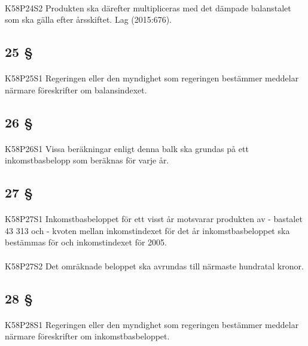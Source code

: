 \documentclass[a4paper,notitlepage,openany,10pt]{book}
\begin{document}
\paragraph*{}
{\tiny K58P24S2}
Produkten ska därefter multipliceras med det dämpade balanstalet som ska gälla efter årsskiftet.
Lag (2015:676).
\subsection*{25 §}
\paragraph*{}
{\tiny K58P25S1}
Regeringen eller den myndighet som regeringen bestämmer meddelar närmare föreskrifter om balansindexet.
\subsection*{26 §}
\paragraph*{}
{\tiny K58P26S1}
Vissa beräkningar enligt denna balk ska grundas på ett inkomstbasbelopp som beräknas för varje år.
\subsection*{27 §}
\paragraph*{}
{\tiny K58P27S1}
Inkomstbasbeloppet för ett visst år motsvarar produkten av
\newline - bastalet 43 313 och
\newline - kvoten mellan inkomstindexet för det år inkomstbasbeloppet ska bestämmas för och inkomstindexet för 2005.
\paragraph*{}
{\tiny K58P27S2}
Det omräknade beloppet ska avrundas till närmaste hundratal kronor.
\subsection*{28 §}
\paragraph*{}
{\tiny K58P28S1}
Regeringen eller den myndighet som regeringen bestämmer meddelar närmare föreskrifter om inkomstbasbeloppet.
\end{document}
